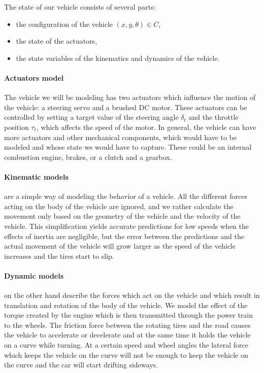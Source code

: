 The state of our vehicle consists of several parts:
\begin{itemize}
	\item the configuration of the vehicle $(x, y, \theta)\in C$,
	\item the state of the actuators,
	\item the state variables of the kinematics and dynamics of the vehicle.
\end{itemize}

\paragraph{Actuators model} 
The vehicle we will be modeling has two actuators which influence the motion of the vehicle: a steering servo and a brushed DC motor. These actuators can be controlled by setting a target value of the steering angle $\delta_t$ and the throttle position $\tau_t$, which affects the speed of the motor. In general, the vehicle can have more actuators and other mechanical components, which would have to be modeled and whose state we would have to capture. These could be an internal combustion engine, brakes, or a clutch and a gearbox.

\paragraph{Kinematic models} are a simple way of modeling the behavior of a vehicle. All the different forces acting on the body of the vehicle are ignored, and we rather calculate the movement only based on the geometry of the vehicle and the velocity of the vehicle. This simplification yields accurate predictions for low speeds when the effects of inertia are negligible, but the error between the predictions and the actual movement of the vehicle will grow larger as the speed of the vehicle increases and the tires start to slip.

\paragraph{Dynamic models} on the other hand describe the forces which act on the vehicle and which result in translation and rotation of the body of the vehicle. We model the effect of the torque created by the engine which is then transmitted through the power train to the wheels. The friction force between the rotating tires and the road causes the vehicle to accelerate or decelerate and at the same time it holds the vehicle on a curve while turning. At a certain speed and wheel angles the lateral force which keeps the vehicle on the curve will not be enough to keep the vehicle on the curve and the car will start drifting sideways.

